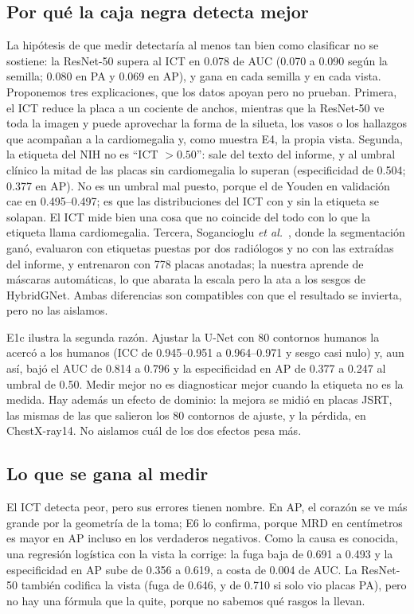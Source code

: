 \documentclass[conference]{IEEEtran}
\begin{document}
\subsection{Por qué la caja negra detecta mejor}

La hipótesis de que medir detectaría al menos tan bien como clasificar no se sostiene: la ResNet-50 supera al ICT en
0.078 de AUC (0.070 a 0.090 según la semilla; 0.080 en PA y 0.069 en AP), y gana en cada semilla y en cada
vista. Proponemos tres explicaciones, que los datos apoyan pero no prueban. Primera, el ICT reduce la placa a un
cociente de anchos, mientras que la ResNet-50 ve toda la imagen y puede aprovechar la forma de la silueta, los vasos
o los hallazgos que acompañan a la cardiomegalia y, como muestra E4, la propia vista. Segunda, la etiqueta del NIH no es
``ICT $>0.50$'': sale del texto del informe, y al umbral clínico la mitad de las placas sin cardiomegalia lo superan
(especificidad de 0.504; 0.377 en AP). No es un umbral mal puesto, porque el de Youden en validación cae en
0.495--0.497; es que las distribuciones del ICT con y sin la etiqueta se solapan. El ICT mide bien una cosa que no
coincide del todo con lo que la etiqueta llama cardiomegalia. Tercera, Sogancioglu \emph{et al.}~\cite{sogancioglu2020cardiomegaly}, donde la
segmentación ganó, evaluaron con etiquetas puestas por dos radiólogos y no con las extraídas del informe, y entrenaron
con 778 placas anotadas; la nuestra aprende de máscaras automáticas, lo que abarata la escala pero la
ata a los sesgos de HybridGNet. Ambas diferencias son compatibles con que el resultado se invierta, pero no las
aislamos.

E1c ilustra la segunda razón. Ajustar la U-Net con 80 contornos humanos la acercó a los humanos (ICC de 0.945--0.951 a
0.964--0.971 y sesgo casi nulo) y, aun así, bajó el AUC de 0.814 a 0.796 y la especificidad en AP de 0.377 a 0.247 al umbral de
0.50. Medir mejor no es diagnosticar mejor cuando la etiqueta no es la medida. Hay además un efecto de dominio: la
mejora se midió en placas JSRT, las mismas de las que salieron los 80 contornos de ajuste, y la pérdida, en
ChestX-ray14. No aislamos cuál de los dos efectos pesa más.

\subsection{Lo que se gana al medir}

El ICT detecta peor, pero sus errores tienen nombre. En AP, el corazón se ve más grande por la geometría de la toma;
E6 lo confirma, porque MRD en centímetros es mayor en AP incluso en los verdaderos negativos. Como la causa es
conocida, una regresión logística con la vista la corrige: la fuga baja de 0.691 a 0.493 y la especificidad en AP
sube de 0.356 a 0.619, a costa de 0.004 de AUC. La ResNet-50 también codifica la vista (fuga de 0.646, y de 0.710 si
solo vio placas PA), pero no hay una fórmula que la quite, porque no sabemos qué rasgos la llevan.
\end{document}
